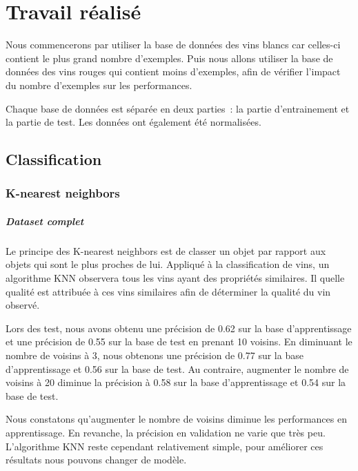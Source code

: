 \chapter{Travail réalisé}
\label{chap:realisation}

Nous commencerons par utiliser la base de données des vins blancs car celles-ci contient le plus grand nombre d'exemples.
Puis nous allons utiliser la base de données des vins rouges qui contient moins d'exemples, afin de vérifier l'impact
du nombre d'exemples sur les performances.

Chaque base de données est séparée en deux parties~: la partie d'entrainement et la partie de test. Les données ont également
été normalisées.

\section{Classification}
\label{sec:classification}

\subsection{K-nearest neighbors}
\label{sec:knn}

\paragraph{Dataset complet}
\label{par:dataset-complet-knn}

Le principe des K-nearest neighbors est de classer un objet par rapport aux objets qui sont le plus proches de lui.
Appliqué à la classification de vins, un algorithme KNN observera tous les vins ayant des propriétés similaires. Il
quelle qualité est attribuée à ces vins similaires afin de déterminer la qualité du vin observé.

Lors des test, nous avons obtenu une précision de 0.62 sur la base d'apprentissage et une précision de 0.55 sur la
base de test en prenant 10 voisins. En diminuant le nombre de voisins à 3, nous obtenons une précision de 0.77 sur la
base d'apprentissage et 0.56 sur la base de test. Au contraire, augmenter le nombre de voisins à 20 diminue la précision
à 0.58 sur la base d'apprentissage et 0.54 sur la base de test.

Nous constatons qu'augmenter le nombre de voisins diminue les performances en apprentissage. En revanche, la précision
en validation ne varie que très peu. L'algorithme KNN reste cependant relativement simple, pour améliorer ces résultats
nous pouvons changer de modèle.

